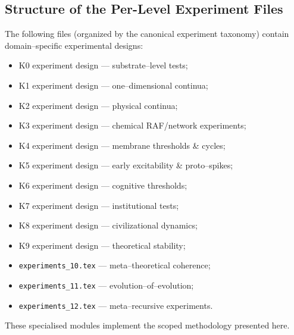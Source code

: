 \subsection{Structure of the Per-Level Experiment Files}

The following files (organized by the canonical experiment taxonomy)
contain domain–specific experimental designs:

\begin{itemize}
    \item K0 experiment design — substrate–level tests;
    \item K1 experiment design — one–dimensional continua;
    \item K2 experiment design — physical continua;
    \item K3 experiment design — chemical RAF/network experiments;
    \item K4 experiment design — membrane thresholds \& cycles;
    \item K5 experiment design — early excitability \& proto–spikes;
    \item K6 experiment design — cognitive thresholds;
    \item K7 experiment design — institutional tests;
    \item K8 experiment design — civilizational dynamics;
    \item K9 experiment design — theoretical stability;
    \item \texttt{experiments\_{10}.tex} — meta–theoretical coherence;
    \item \texttt{experiments\_{11}.tex} — evolution–of–evolution;
    \item \texttt{experiments\_{12}.tex} — meta–recursive experiments.
\end{itemize}

These specialised modules implement the scoped methodology presented here.
